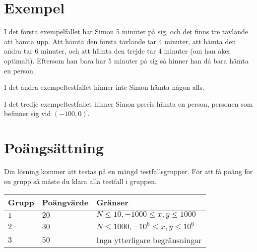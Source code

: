 \section*{Exempel}
I det första exempelfallet har Simon 5 minuter på sig, och det finns tre
tävlande att hämta upp. Att hämta den första tävlande tar 4 minuter, att hämta
den andra tar 6 minuter, och att hämta den trejde tar 4 minuter (om han åker
optimalt). Eftersom han bara har 5 minuter på sig så hinner han då bara hämta
en person.

I det andra exempeltestfallet hinner inte Simon hämta någon alls.

I det tredje exempeltestfallet hinner Simon precis hämta en person, personen
som befinner sig vid $(-100, 0)$.

\section*{Poängsättning}
Din lösning kommer att testas på en mängd testfallsgrupper.
För att få poäng för en grupp så måste du klara alla testfall i gruppen.

\noindent
\begin{tabular}{| l | l | l |}
  \hline
  Grupp & Poängvärde & Gränser \\ \hline
  $1$   & $20$       & $N \leq 10, -1000 \leq x,y \leq 1000$ \\ \hline
  $2$   & $30$       & $N \leq 1000, -10^6 \leq x,y \leq 10^6$ \\ \hline
  $3$   & $50$       & Inga ytterligare begränsningar \\ \hline
\end{tabular}
